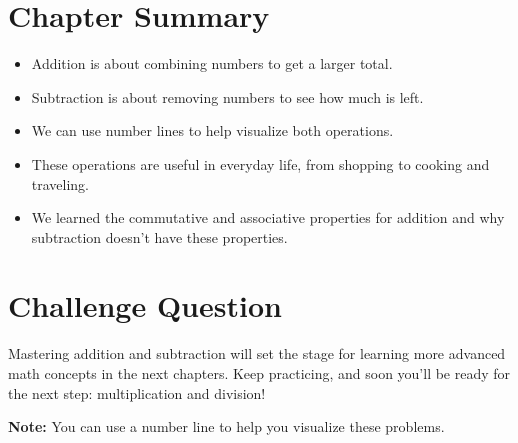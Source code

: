 \section{Chapter Summary}
\begin{itemize}
    \item Addition is about combining numbers to get a larger total.
    \item Subtraction is about removing numbers to see how much is left.
    \item We can use number lines to help visualize both operations.
    \item These operations are useful in everyday life, from shopping to cooking and traveling.
    \item We learned the commutative and associative properties for addition and why subtraction doesn’t have these properties.
\end{itemize}
\section{Challenge Question}
Mastering addition and subtraction will set the stage for learning more advanced math concepts in the next chapters. Keep practicing, and soon you’ll be ready for the next step: multiplication and division!

\textbf{Note:} You can use a number line to help you visualize these problems. 
\noindent
\begin{center}
    \end{center}
    
